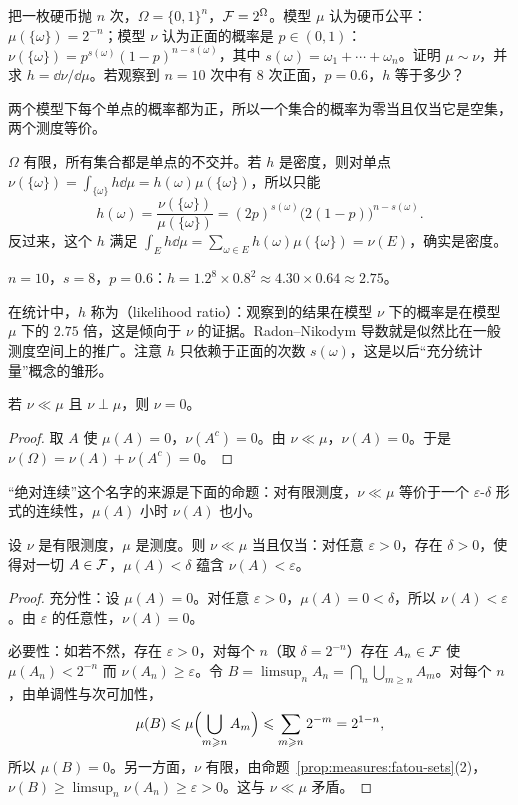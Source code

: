\begin{workedexample}\label{we:ac:likelihood}
把一枚硬币抛 $n$ 次，$\Omega=\{0,1\}^n$，$\mathcal{F}=2^\Omega$。模型 $\mu$ 认为硬币公平：$\mu(\{\omega\})=2^{-n}$；模型 $\nu$ 认为正面的概率是 $p\in(0,1)$：$\nu(\{\omega\})=p^{s(\omega)}(1-p)^{n-s(\omega)}$，其中 $s(\omega)=\omega_1+\cdots+\omega_n$。证明 $\mu\sim\nu$，并求 $h=\dd\nu/\dd\mu$。若观察到 $n=10$ 次中有 $8$ 次正面，$p=0.6$，$h$ 等于多少？
\end{workedexample}
\begin{solution}
两个模型下每个单点的概率都为正，所以一个集合的概率为零当且仅当它是空集，两个测度等价。

$\Omega$ 有限，所有集合都是单点的不交并。若 $h$ 是密度，则对单点 $\nu(\{\omega\})=\int_{\{\omega\}}h\dd\mu=h(\omega)\mu(\{\omega\})$，所以只能
\[
h(\omega)=\frac{\nu(\{\omega\})}{\mu(\{\omega\})}=(2p)^{s(\omega)}\bigl(2(1-p)\bigr)^{n-s(\omega)} .
\]
反过来，这个 $h$ 满足 $\int_Eh\dd\mu=\sum_{\omega\in E}h(\omega)\mu(\{\omega\})=\nu(E)$，确实是密度。

$n=10$，$s=8$，$p=0.6$：$h=1.2^8\times0.8^2\approx4.30\times0.64\approx2.75$。

在统计中，$h$ 称为（likelihood ratio）：观察到的结果在模型 $\nu$ 下的概率是在模型 $\mu$ 下的 $2.75$ 倍，这是倾向于 $\nu$ 的证据。Radon--Nikodym 导数就是似然比在一般测度空间上的推广。注意 $h$ 只依赖于正面的次数 $s(\omega)$，这是以后“充分统计量”概念的雏形。
\end{solution}

\begin{proposition}\label{prop:ac:ac-and-singular}
若 $\nu\ll\mu$ 且 $\nu\perp\mu$，则 $\nu=0$。
\end{proposition}
\begin{proof}
取 $A$ 使 $\mu(A)=0$，$\nu(A^c)=0$。由 $\nu\ll\mu$，$\nu(A)=0$。于是 $\nu(\Omega)=\nu(A)+\nu(A^c)=0$。
\end{proof}

“绝对连续”这个名字的来源是下面的命题：对有限测度，$\nu\ll\mu$ 等价于一个 $\varepsilon$-$\delta$ 形式的连续性，$\mu(A)$ 小时 $\nu(A)$ 也小。

\begin{proposition}\label{prop:ac:epsilon-delta}
设 $\nu$ 是有限测度，$\mu$ 是测度。则 $\nu\ll\mu$ 当且仅当：对任意 $\varepsilon>0$，存在 $\delta>0$，使得对一切 $A\in\mathcal{F}$，$\mu(A)<\delta$ 蕴含 $\nu(A)<\varepsilon$。
\end{proposition}
\begin{proof}
充分性：设 $\mu(A)=0$。对任意 $\varepsilon>0$，$\mu(A)=0<\delta$，所以 $\nu(A)<\varepsilon$。由 $\varepsilon$ 的任意性，$\nu(A)=0$。

必要性：如若不然，存在 $\varepsilon>0$，对每个 $n$（取 $\delta=2^{-n}$）存在 $A_n\in\mathcal{F}$ 使 $\mu(A_n)<2^{-n}$ 而 $\nu(A_n)\geqslant\varepsilon$。令 $B=\limsup_nA_n=\bigcap_n\bigcup_{m\geqslant n}A_m$。对每个 $n$，由单调性与次可加性，
\[
\mu(B)\leqslant\mu\Bigl(\bigcup_{m\geqslant n}A_m\Bigr)\leqslant\sum_{m\geqslant n}2^{-m}=2^{1-n},
\]
所以 $\mu(B)=0$。另一方面，$\nu$ 有限，由命题~\ref{prop:measures:fatou-sets}(2)，$\nu(B)\geqslant\limsup_n\nu(A_n)\geqslant\varepsilon>0$。这与 $\nu\ll\mu$ 矛盾。
\end{proof}

